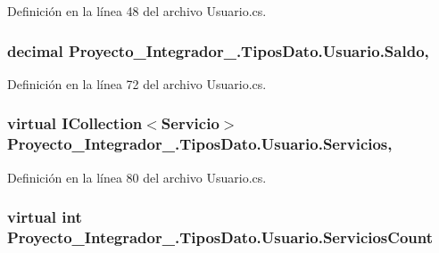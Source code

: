Definición en la línea 48 del archivo Usuario.\-cs.

\hypertarget{class_proyecto___integrador__3_1_1_tipos_dato_1_1_usuario_ad29821993f63ad36d711b1e2b90b1be0}{
\subsubsection[{Saldo}]{\setlength{\rightskip}{0pt plus 5cm}decimal Proyecto\-\_\-\-Integrador\-\_.\-Tipos\-Dato.\-Usuario.\-Saldo\hspace{0.3cm}{\ttfamily [get]}, {\ttfamily [set]}}}\label{class_proyecto___integrador__3_1_1_tipos_dato_1_1_usuario_ad29821993f63ad36d711b1e2b90b1be0}


Definición en la línea 72 del archivo Usuario.\-cs.

\hypertarget{class_proyecto___integrador__3_1_1_tipos_dato_1_1_usuario_a95e6bba4296f208230d6374df201f24b}{
\subsubsection[{Servicios}]{\setlength{\rightskip}{0pt plus 5cm}virtual I\-Collection$<${\bf Servicio}$>$ Proyecto\-\_\-\-Integrador\-\_.\-Tipos\-Dato.\-Usuario.\-Servicios\hspace{0.3cm}{\ttfamily [get]}, {\ttfamily [set]}}}\label{class_proyecto___integrador__3_1_1_tipos_dato_1_1_usuario_a95e6bba4296f208230d6374df201f24b}


Definición en la línea 80 del archivo Usuario.\-cs.

\hypertarget{class_proyecto___integrador__3_1_1_tipos_dato_1_1_usuario_a28988ddc822fdf9d27d55cc2340ab65f}{
\subsubsection[{Servicios\-Count}]{\setlength{\rightskip}{0pt plus 5cm}virtual int Proyecto\-\_\-\-Integrador\-\_.\-Tipos\-Dato.\-Usuario.\-Servicios\-Count\hspace{0.3cm}{\ttfamily [get]}}}\label{class_proyecto___integrador__3_1_1_tipos_dato_1_1_usuario_a28988ddc822fdf9d27d55cc2340ab65f}


